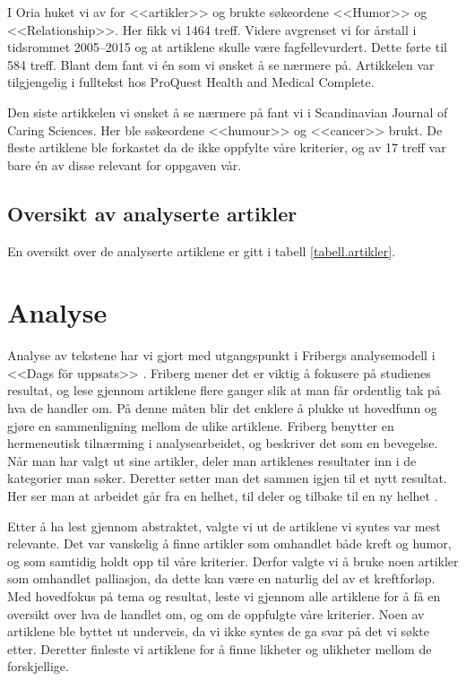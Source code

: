 I Oria huket vi av for <<artikler>> og brukte søkeordene <<Humor>> og
<<Relationship>>. Her fikk vi 1464 treff. Videre avgrenset vi for årstall i
tidsrommet 2005--2015 og at artiklene skulle være fagfellevurdert. Dette førte
til 584 treff. Blant dem fant vi én som vi ønsket å se nærmere på.  Artikkelen
var tilgjengelig i fulltekst hos ProQuest Health and Medical Complete.

Den siste artikkelen vi ønsket å se nærmere på fant vi i Scandinavian Journal
of Caring Sciences. Her ble søkeordene <<humour>> og <<cancer>> brukt. De
fleste artiklene ble forkastet da de ikke oppfylte våre kriterier, og av 17
treff var bare én av disse relevant for oppgaven vår.

\subsection{Oversikt av analyserte artikler}

En oversikt over de analyserte artiklene er gitt i tabell
\vref{tabell.artikler}.



\section{Analyse}

Analyse av tekstene har vi gjort med utgangspunkt i Fribergs analysemodell i
<<Dags för uppsats>> \citeyear{friberg2006}. Friberg mener det er viktig å
fokusere på studienes resultat, og lese gjennom artiklene flere ganger slik at
man får ordentlig tak på hva de handler om. På denne måten blir det enklere å
plukke ut hovedfunn og gjøre en sammenligning mellom de ulike artiklene.
Friberg benytter en hermeneutisk tilnærming i analysearbeidet, og beskriver det
som en bevegelse. Når man har valgt ut sine artikler, deler man artiklenes
resultater inn i de kategorier man søker. Deretter setter man det sammen igjen
til et nytt resultat. Her ser man at arbeidet går fra en helhet, til deler og
tilbake til en ny helhet \cite[s.~110]{friberg2006}.

Etter å ha lest gjennom abstraktet, valgte vi ut de artiklene vi syntes var
mest relevante. Det var vanskelig å finne artikler som omhandlet både kreft og
humor, og som samtidig holdt opp til våre kriterier. Derfor valgte vi å bruke
noen artikler som omhandlet palliasjon, da dette kan være en naturlig del av et
kreftforløp. Med hovedfokus på tema og resultat, leste vi gjennom alle
artiklene for å få en oversikt over hva de handlet om, og om de oppfulgte våre
kriterier. Noen av artiklene ble byttet ut underveis, da vi ikke syntes de ga
svar på det vi søkte etter. Deretter finleste vi artiklene for å finne likheter
og ulikheter mellom de forskjellige.

